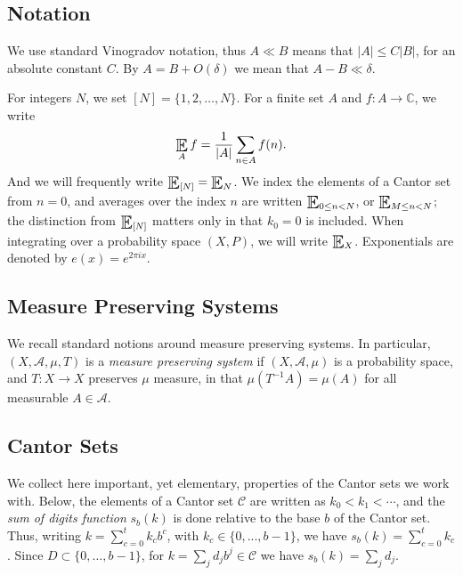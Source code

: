 \documentclass[12pt]{amsart}
\numberwithin{equation}{section}
\theoremstyle{definition}
\DeclareMathOperator*{\Expectation}{\scalerel*{\mathbb{E}}{\textstyle\sum}}
\begin{document}
\subsection{Notation} 
We use standard Vinogradov notation, thus $A\ll B$ means that $\lvert A\rvert \leq C \lvert B\rvert$, 
for an absolute constant $C$. By $A=B+O(\delta)$ we mean that $A-B \ll \delta$.  

For integers $N$, we set $[N] = \{1,2, \ldots, N\}$. 
For a finite set $A$ and $f \colon A\to \mathbb C$, we write 
\begin{equation}
    \Expectation_A f = \frac{1}{\lvert A\rvert} 
    \sum_{n\in A} f(n). 
\end{equation}
And we will frequently write $\Expectation_{[N]}=\Expectation_N$.  
We index the elements of a Cantor set from $n=0$, and averages over the index $n$ are written $\Expectation_{0\leq n<N}$, or $\Expectation_{M\leq n<N}$; 
the distinction from $\Expectation_{[N]}$ matters only in that $k_0=0$ is included.  
When integrating over a probability space $(X,P)$, we will write $\Expectation_X$. 
Exponentials are denoted by $e(x)=e^{2 \pi i x}$. 

\subsection{Measure Preserving Systems} 
We recall standard notions around measure preserving systems.  
In particular, $(X,\mathcal A,\mu,T)$ 
is a \emph{measure preserving system} if $(X,\mathcal A,\mu)$ is a probability space, and $T \colon X\to X$ preserves $\mu$ measure, in that $\mu(T^{-1} A)=\mu(A)$ for all measurable $A\in \mathcal A$.  






\subsection{Cantor Sets} %
\label{sub:cantor_sets}

We collect here important, yet elementary, properties of the Cantor sets we work with. 
Below, the elements of a Cantor set $\mathcal C$ are written as $k_0<k_1 < \cdots$, and the \emph{sum of digits function} $s_b(k)$ is done relative to the base $b$ of the Cantor set. Thus, writing $k=\sum_{c=0}^t k_c b^c$, with $k_c \in \{0,...,b-1\}$, we have $s_b(k)= \sum_{c=0}^t k_c $.  
Since $D\subset\{0,\ldots,b-1\}$, for $k=\sum_j d_jb^j\in\mathcal C$ we have $s_b(k)=\sum_j d_j$. 
\end{document}
